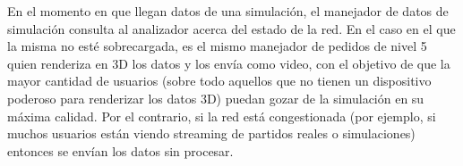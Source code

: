 En el momento en que llegan datos de una simulación, el manejador de datos de simulación consulta al analizador acerca del estado de la red. En el caso en el que la misma no esté sobrecargada, es el mismo manejador de pedidos de nivel 5 quien renderiza en 3D los datos y los envía como video, con el objetivo de que la mayor cantidad de usuarios (sobre todo aquellos que no tienen un dispositivo poderoso para renderizar los datos 3D) puedan gozar de la simulación en su máxima calidad. Por el contrario, si la red está congestionada (por ejemplo, si muchos usuarios están viendo streaming de partidos reales o simulaciones) entonces se envían los datos sin procesar.
